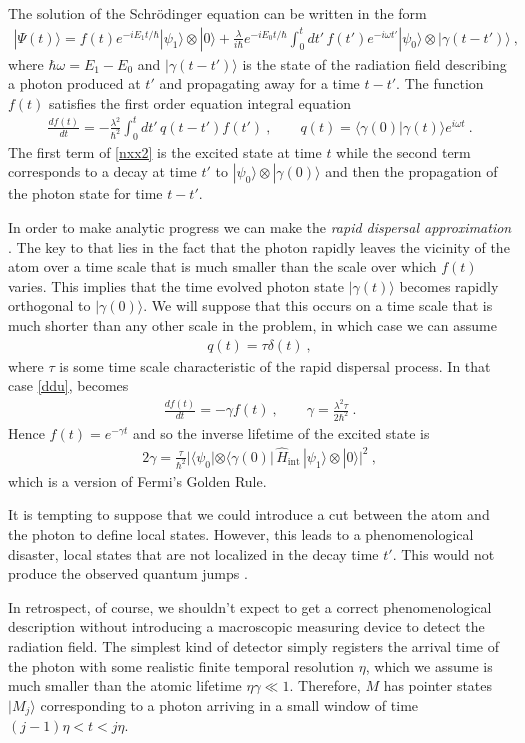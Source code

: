 \documentclass[12pt]{article}
\theoremstyle{plain}
\theoremstyle{definition}
\theoremstyle{remark}
\def\bra#1{\langle #1|}
\def\ket#1{| #1\rangle}
\newcommand{\EQ}[1]{\begin{equation}\begin{split} #1
\end{split}\end{equation}}
\begin{document}
The solution of the Schr\"odinger equation can be written in the form
\EQ{
\ket{\Psi(t)}=f(t)e^{-iE_1t/\hbar}\ket{\psi_1}\otimes\ket{0}+
\frac{\lambda}{i\hbar}e^{-iE_0t/\hbar}\int_0^t dt'\,f(t')e^{-i\omega t'}\ket{\psi_0}\otimes \ket{\gamma(t-t')}\ ,
\label{nxx2}
}
where $\hbar\omega=E_1-E_0$ and $\ket{\gamma(t-t')}$ is the state of the 
radiation field describing a photon produced at $t'$ and propagating away for a time $t-t'$.
The function $f(t)$ satisfies the first order equation integral equation
\EQ{
\frac{df(t)}{dt}=-\frac{\lambda^2}{\hbar^2}\int_0^tdt'\,q(t-t')f(t')\ ,\qquad q(t)=\bra{\gamma(0)}\gamma(t)\rangle e^{i\omega t}\ .
\label{ddu}
}
The first term of \eqref{nxx2} is the excited state at time $t$ while the second term corresponds to a decay at time $t'$ to $\ket{\psi_0}\otimes\ket{\gamma(0)}$ and then the propagation of the photon state for time $t-t'$.

In order to make analytic progress we can make the {\it rapid dispersal approximation\/} \cite{Sud}. 
The key to that lies in the fact that
the photon rapidly leaves the vicinity of the atom over a time scale that is much smaller than the scale over which $f(t)$ varies. This implies that the time evolved photon state $\ket{\gamma(t)}$ becomes rapidly orthogonal to $\ket{\gamma(0)}$. We will suppose that this occurs on a time scale that is much shorter than any other scale in the problem, in which case we can assume
\EQ{
q(t)=\tau\delta(t)\ ,
\label{op1}
}
where $\tau$ is some time scale characteristic of the rapid dispersal process. In that case \eqref{ddu}, becomes
\EQ{
\frac{df(t)}{dt}=-\gamma f(t)\ ,\qquad \gamma=
\frac{\lambda^2\tau}{2\hbar^2}\ .
\label{gyq}
}
Hence $f(t)=e^{-\gamma t}$ and so the inverse lifetime of the excited state is 
\EQ{
2\gamma=\frac\tau{\hbar^2}\big|\bra{\psi_0}\otimes\bra{\gamma(0)}\,\hat H_\text{int}\,\ket{\psi_1}\otimes\ket{0}\big|^2\ ,
}
which is a version of Fermi's Golden Rule.

It is tempting to suppose that we could introduce a cut between the atom and the photon to define local states. However, this leads to a phenomenological disaster, local states that are not localized in the decay time $t'$. This would not produce  the observed quantum jumps \cite{Hollowood:2013cbr}. 

In retrospect, of course, we shouldn't expect to get a correct phenomenological description without introducing a macroscopic measuring device to detect the radiation field. The simplest kind of detector simply registers the arrival time of the photon with some realistic finite temporal resolution $\eta$, which we assume is much smaller than the atomic lifetime $\eta\gamma\ll 1$. Therefore, $M$ has pointer states $\ket{M_j}$ corresponding to a photon  arriving in a small window of time $(j-1)\eta<t<j\eta$. 
\end{document}
